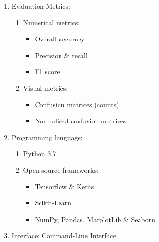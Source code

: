 \begin{enumerate}
    \item Evaluation Metrics:
    \begin{enumerate}
        \item Numerical metrics:
        \begin{itemize}
            \item Overall accuracy
            \item Precision \& recall
            \item F1 score
        \end{itemize}
        \item Visual metrics:
        \begin{itemize}
            \item Confusion matrices (counts)
            \item Normalised confusion matrices
        \end{itemize}
    \end{enumerate}
    
    \item Programming language:
    \begin{enumerate}
        \item Python 3.7
        \item Open-source frameworks:
        \begin{itemize}
            \item Tensorflow \& Keras
            \item Scikit-Learn
            \item NumPy, Pandas, MatplotLib \& Seaborn
        \end{itemize}
    \end{enumerate}
    
    \item Interface: Command-Line Interface
\end{enumerate}

